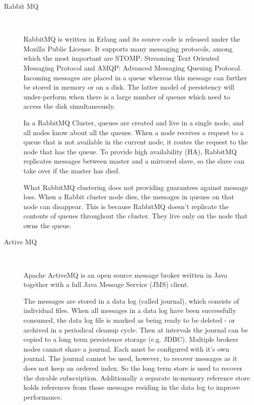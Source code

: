 \begin{description}
    \item [Rabbit MQ] \hfill \\
    {
    RabbitMQ is written in Erlang and its source code is released under the
    Mozilla Public License. It supports many messaging protocols, among
    which the most important are STOMP: Streaming Text Oriented Messaging
    Protocol and AMQP: Advanced Messaging Queuing Protocol. Incoming messages
    are placed in a queue whereas this message can further be stored in memory
    or on a disk. The latter model of persistency will under-perform when there is 
    a large number of queues which need to access the disk simultaneously.
    \cite{rabbitmq}

    In a RabbitMQ Cluster, queues are created and live in a single node, and all
    nodes know about all the queues. When a node receives a request to a queue
    that is not available in the current node, it routes the request to the node
    that has the queue. To provide high availability (HA), RabbitMQ replicates
    messages between master and a mirrored slave, so the slave can take over if the
    master has died. \cite{wickramarachchi2012andes}

    What RabbitMQ clustering does not providing guarantees against message loss.
    When a Rabbit cluster node dies, the messages in queues on that
    node can disappear. This is because RabbitMQ doesn't replicate the contents
    of queues throughout the cluster. They live only on the node that owns the
    queue. \cite{videla2012rabbitmq}
    }
    \item [Active MQ] \hfill \\
    {
    Apache ActiveMQ is an open source message broker written in Java
    together with a full Java Message Service (JMS) client. 

    The messages are stored in a data log (called journal), which consists of
    individual files. When all messages in a data log have been successfully
    consumed, the data log file is marked as being ready to be deleted - or
    archived in a periodical cleanup cycle. Then at intervals the journal can be
    copied to a long term persistence storage (e.g. JDBC). Multiple
    brokers nodes cannot share a journal. Each must be configured with it's own
    journal. The journal cannot be used, however, to recover messages as it does
    not keep an ordered index. So the long term store is used to recover the
    durable subscription. Additionally a separate in-memory reference store
    holds references from those messages residing in the data log to improve
    performance.

}
\end{description}
